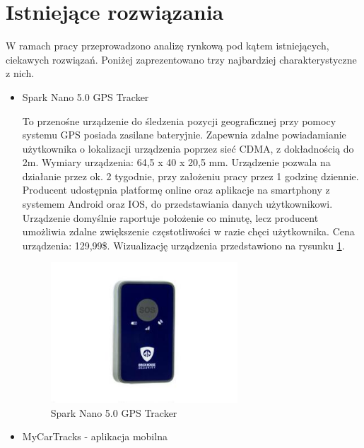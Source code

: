 \section{Istniejące rozwiązania}

W ramach pracy przeprowadzono analizę rynkową pod kątem istniejących, ciekawych rozwiązań. Poniżej zaprezentowano trzy najbardziej charakterystyczne z nich.

\begin{itemize}
\item Spark Nano 5.0 GPS Tracker

To przenośne urządzenie do śledzenia pozycji geograficznej przy pomocy systemu GPS posiada zasilane bateryjnie. Zapewnia zdalne powiadamianie użytkownika o lokalizacji urządzenia poprzez sieć CDMA, z dokładnością do 2m. Wymiary urządzenia: 64,5 x 40 x 20,5 mm. Urządzenie pozwala na działanie przez ok. 2 tygodnie, przy założeniu pracy przez 1 godzinę dziennie. Producent udostępnia platformę online oraz aplikacje na smartphony z systemem Android oraz IOS, do przedstawiania danych użytkownikowi.   Urządzenie domyślnie raportuje położenie co minutę, lecz producent umożliwia zdalne zwiększenie częstotliwości w razie chęci użytkownika. Cena urządzenia: 129,99\$. Wizualizację urządzenia przedstawiono na rysunku \ref{fig:image_spark_nano_tracker}.
\begin{figure}[h]
	\centering
	\includegraphics[width=7cm]{img/introduction/spark_nano.jpg}
	\caption{Spark Nano 5.0 GPS Tracker}
	\label{fig:image_spark_nano_tracker}
\end{figure}

\item MyCarTracks - aplikacja mobilna


\end{itemize}
